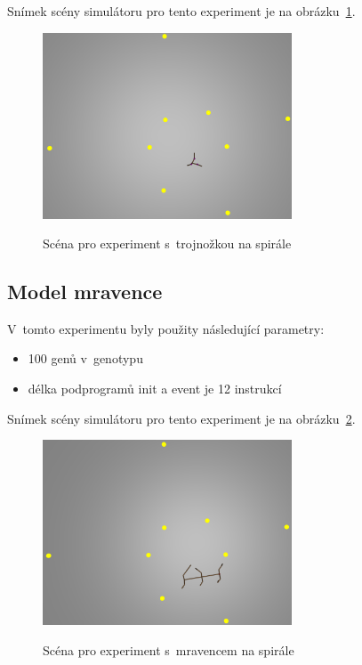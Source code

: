 Snímek scény simulátoru pro tento experiment je na obrázku~\ref{fig:trojnozka_spirala_zhora}.
\begin{figure}[h]
    \centering
    {\includegraphics[width=20em]{obrazky/trojnozka_spirala_zhora.png}}
    \caption{
    Scéna pro experiment s~trojnožkou na spirále
    }
    \label{fig:trojnozka_spirala_zhora}
\end{figure}

\subsection{Model mravence}

V~tomto experimentu byly použity následující parametry:
\begin{itemize}
    \item 100 genů v~genotypu
    \item délka podprogramů init a event je 12 instrukcí
\end{itemize}

Snímek scény simulátoru pro tento experiment je na obrázku~\ref{fig:mravenec_spirala_zhora}.
\begin{figure}[h]
    \centering
    {\includegraphics[width=20em]{obrazky/mravenec_spirala_zhora.png}}
    \caption{
    Scéna pro experiment s~mravencem na spirále
    }
    \label{fig:mravenec_spirala_zhora}
\end{figure}


